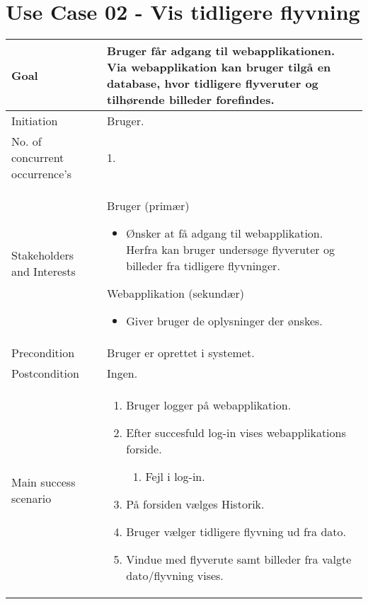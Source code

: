 \section{Use Case 02 - Vis tidligere flyvning}

\begin{table}[H]
\begin{tabular}{|l|p{10cm}|}
\hline

Goal	 								& Bruger får adgang til webapplikationen. Via webapplikation kan bruger tilgå en
database, hvor tidligere flyveruter og tilhørende billeder forefindes. \\\hline
Initiation 							& Bruger. \\\hline
No. of concurrent occurrence’s		& 1. \\\hline
Stakeholders	and Interests			& Bruger (primær) 
										\begin{itemize}
											\item Ønsker at få adgang til webapplikation. Herfra kan bruger
undersøge flyveruter og billeder fra tidligere flyvninger.
										\end{itemize} 
									  Webapplikation (sekundær)
										\begin{itemize}
											\item Giver bruger de oplysninger der ønskes.
										\end{itemize} \\\hline
Precondition							& Bruger er oprettet i systemet. \\\hline
Postcondition						& Ingen. \\\hline
Main success scenario				&
 
									\renewcommand{\labelenumi}{\arabic{enumi}.}
									\renewcommand{\labelenumii}{\Roman{enumii}:}

									\begin{enumerate}[topsep=0.0cm, leftmargin=0.5cm]
										\item Bruger logger på webapplikation.
										\item Efter succesfuld log-in vises webapplikations forside.
											\begin{enumerate}[partopsep=4cm, topsep=0cm, leftmargin=1cm]
												\item Fejl i log-in.
											\end{enumerate}
										\item På forsiden vælges Historik.
										\item Bruger vælger tidligere flyvning ud fra dato.	
										\item Vindue med flyverute samt billeder fra valgte dato/flyvning vises.
									\end{enumerate} \\\hline	


\end{tabular}
\end{table}
